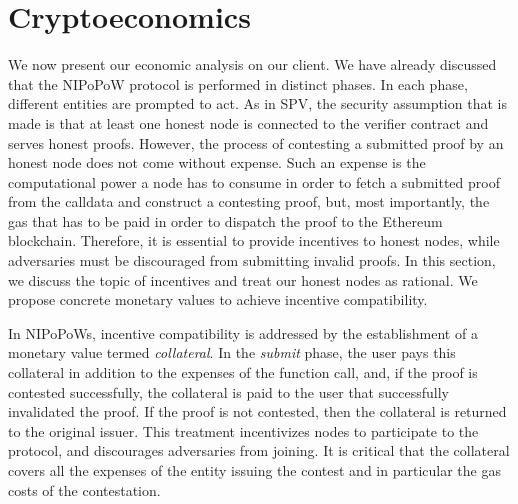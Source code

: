\chapter{Cryptoeconomics}

We now present our economic analysis on our client. We have
already discussed that the NIPoPoW protocol is performed in distinct phases. In
each phase, different entities are prompted to act. As in SPV, the security
assumption that is made is that at least one honest node is connected to the
verifier contract and serves honest proofs. However, the process of contesting
a submitted proof by an honest node does not come without expense.  Such an
expense is the computational power a node has to consume in order to fetch a
submitted proof from the calldata and construct a contesting proof, but, most
importantly, the gas that has to be paid in order to dispatch the proof to
the Ethereum blockchain. Therefore, it is essential to provide incentives to
honest nodes, while adversaries must be discouraged from
submitting invalid proofs. In this section, we discuss the topic of incentives
and treat our honest nodes as rational. We propose concrete monetary values
to achieve incentive compatibility.

In NIPoPoWs, incentive compatibility is addressed by the establishment of a
monetary value termed \emph{collateral}. In the \emph{submit} phase, the user
pays this collateral in addition to the expenses of the function call, and, if
the proof is contested successfully, the collateral is paid to the user that
successfully invalidated the proof. If the proof is not contested, then the
collateral is returned to the original issuer. This treatment incentivizes
nodes to participate to the protocol, and discourages adversaries from joining.
It is critical that the collateral covers all the expenses of the entity
issuing the contest and in particular the gas costs of the contestation.

